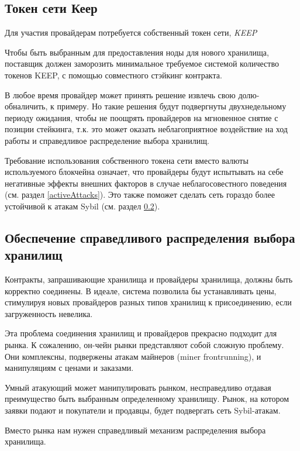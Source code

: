 \documentclass[english,russian,11pt]{article}
\begin{document}
\subsection{Токен сети Кеер}

Для участия провайдерам потребуется собственный токен сети, 
 \textit{KEEP}

Чтобы быть выбранным для предоставления ноды для нового хранилища, 
поставщик должен заморозить минимальное требуемое системой 
количество токенов KEEP, с помощью совместного стэйкинг контракта.

В любое время провайдер может принять решение извлечь свою долю- 
обналичить, к примеру. Но такие решения будут подвергнуты 
двухнедельному периоду ожидания, чтобы не поощрять провайдеров 
на мгновенное снятие с позиции стейкинга, т.к. это может оказать 
неблагоприятное воздействие на ход работы и справедливое 
распределение выбора хранилищ.

Требование использования собственного токена сети вместо валюты 
используемого блокчейна означает, что провайдеры будут испытывать 
на себе негативные эффекты внешних факторов в случае 
неблагосовестного поведения (см. раздел \ref{activeAttacks}). 
Это также поможет сделать сеть гораздо более устойчивой к атакам 
Sybil (см. раздел \ref{fairKeepSelection}).

\subsection{Обеспечение справедливого распределения выбора хранилищ}
\label{fairKeepSelection}

Контракты, запрашивающие хранилища и провайдеры хранилища, должны 
быть корректно соединены. В идеале, система позволила бы 
устанавливать цены, стимулируя новых провайдеров разных типов 
хранилищ к присоединению, если загруженность невелика.

Эта проблема соединения хранилищ и провайдеров прекрасно подходит 
для рынка. К сожалению, он-чейн рынки представляют собой сложную 
проблему. Они комплексны, подвержены атакам майнеров 
(miner frontrunning), и манипуляциям с ценами и заказами. 
  
Умный атакующий может манипулировать рынком, несправедливо отдавая 
преимущество быть выбранным определенному хранилищу. Рынок, на 
котором заявки подают и покупатели и продавцы, будет подвергать 
сеть Sybil-атакам.
  
Вместо рынка нам нужен справедливый механизм распределения выбора 
хранилища.
\end{document}
